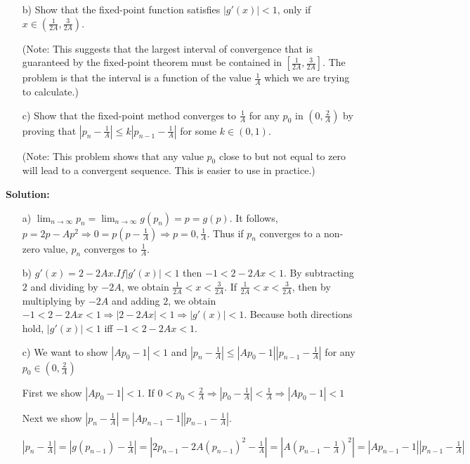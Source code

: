 \documentclass[10pt]{article}
\begin{document}
\begin{enumerate}[label=\bfseries Problem \arabic*:]
\begin{itemize}
\item[b)] Show that the fixed-point function satisfies $|g'(x)|<1$, only if $x \in (\frac{1}{2A}, \frac{3}{2A})$. 

(Note: This suggests that the largest interval of convergence that is guaranteed by the fixed-point theorem must be contained in $[\frac{1}{2A}, \frac{3}{2A}]$. The problem is that the interval is a function of the value $\frac{1}{A}$ which we are trying to calculate.)




\item[c)] Show that the fixed-point method converges to $\frac{1}{A}$ for any $p_0$  in $(0, \frac{2}{A})$ by proving  that $\left|p_n-\frac{1}{A} \right|  \leq k \left|p_{n-1}-\frac{1}{A} \right| $ for some $k \in (0,1)$.

(Note: This problem shows that any value $p_0$ close to but not equal to zero will lead to a convergent sequence. This is easier to use in practice.)
\end{itemize}
\vspace{1em}
\textbf{Solution:}\par
\begin{itemize}
    \item [a)] $\displaystyle{\lim_{n\rightarrow\infty}}p_n=\displaystyle{\lim_{n\rightarrow\infty}}g(p_n)=p=g(p)$. It follows, $p=2p-Ap^2\Rightarrow 0=p(p-\frac{1}{A})\Rightarrow p=0,\frac{1}{A}$. Thus if $p_n$ converges to a non-zero value, $p_n$ converges to $\frac{1}{A}$.
    \item [b)] $g'(x)=2-2Ax. If |g'(x)|<1$ then $-1<2-2Ax<1$. By subtracting $2$ and dividing by $-2A$, we obtain $\frac{1}{2A}<x<\frac{3}{2A}$. If $\frac{1}{2A}<x<\frac{3}{2A}$, then by multiplying by $-2A$ and adding $2$, we obtain $-1<2-2Ax<1\Rightarrow |2-2Ax|<1\Rightarrow |g'(x)|<1$. Because both directions hold, $|g'(x)|<1$ iff $-1<2-2Ax<1$.
    \item [c)] We want to show $|Ap_0-1|<1$ and $|p_n-\frac{1}{A}|\le |Ap_0-1||p_{n-1}-\frac{1}{A}|$ for any $p_0\in(0,\frac{2}{A})$\par
    First we show $|Ap_0-1|<1$. If $0<p_0<\frac{2}{A}\Rightarrow|p_0-\frac{1}{A}|<\frac{1}{A}\Rightarrow|Ap_0-1|<1$\par 
    Next we show $|p_n-\frac{1}{A}|=|Ap_{n-1}-1||p_{n-1}-\frac{1}{A}|$.\par
    $|p_n-\frac{1}{A}|=|g(p_{n-1})-\frac{1}{A}|=|2p_{n-1}-2A(p_{n-1})^2-\frac{1}{A}|=|A(p_{n-1}-\frac{1}{A})^2|=|Ap_{n-1}-1||p_{n-1}-\frac{1}{A}|$\par

\end{itemize}
\end{enumerate}
\end{document}
